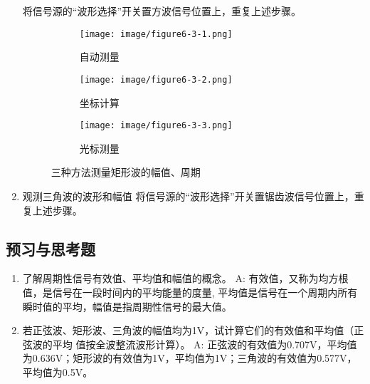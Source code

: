 \documentclass[UTF8]{article}
\begin{document}
\begin{enumerate}[label=\textbf{\arabic*}.]
                \newline 将信号源的“波形选择”开关置方波信号位置上，重复上述步骤。
                \begin{figure}[H]
                    \centering
                    \begin{subfigure}[H]{0.45\textwidth}
                        \centering
                        \texttt{[image: image/figure6-3-1.png]}
                        \caption{自动测量}
                    \end{subfigure}
                    \hfill
                    \begin{subfigure}[H]{0.45\textwidth}
                        \centering
                        \texttt{[image: image/figure6-3-2.png]}
                        \caption{坐标计算}
                    \end{subfigure}
                    \begin{subfigure}[H]{0.45\textwidth}
                        \centering
                        \texttt{[image: image/figure6-3-3.png]}
                        \caption{光标测量}
                    \end{subfigure}
                    \caption{三种方法测量矩形波的幅值、周期}
                \end{figure}
                \item 观测三角波的波形和幅值
                \newline 将信号源的“波形选择”开关置锯齿波信号位置上，重复上述步骤。
            \end{enumerate}
        \subsection{预习与思考题}
            \begin{enumerate}[label=\textbf{\arabic*}.]
                \item 了解周期性信号有效值、平均值和幅值的概念。 \newline
                A: 有效值，又称为均方根值，是信号在一段时间内的平均能量的度量,
                平均值是信号在一个周期内所有瞬时值的平均，幅值是指周期性信号的最大值。
                \item 若正弦波、矩形波、三角波的幅值均为1V，试计算它们的有效值和平均值（正弦波的平均
                值按全波整流波形计算）。\newline
                A: 正弦波的有效值为0.707V，平均值为0.636V；矩形波的有效值为1V，平均值为1V；三角波的有效值为0.577V，平均值为0.5V。
            \end{enumerate}
\end{document}
